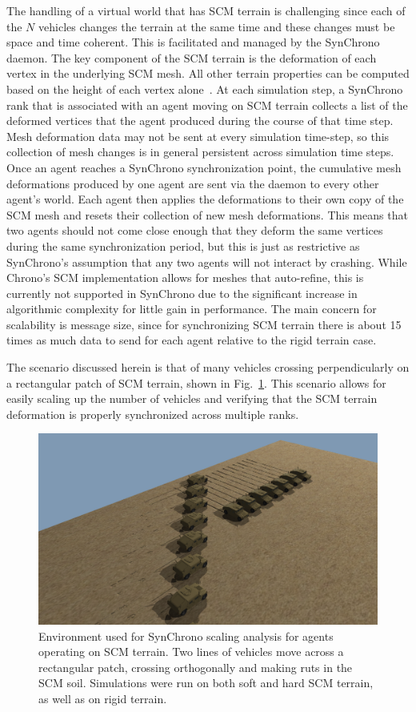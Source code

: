 \documentclass[12pt,twocolumn]{article}
\begin{document}
The handling of a virtual world that has SCM terrain is challenging since each of the $N$ vehicles changes the terrain at the same time and these changes must be space and time coherent. This is facilitated and managed by the SynChrono daemon. The key component of the SCM terrain is the deformation of each vertex in the underlying SCM mesh. All other terrain properties can be computed based on the height of each vertex alone~\cite{ChronoSCM2019}. At each simulation step, a SynChrono rank that is associated with an agent moving on SCM terrain collects a list of the deformed vertices that the agent produced during the course of that time step. Mesh deformation data may not be sent at every simulation time-step, so this collection of mesh changes is in general persistent across simulation time steps. Once an agent reaches a SynChrono synchronization point, the cumulative mesh deformations produced by one agent are sent via the daemon to every other agent's world. Each agent then applies the deformations to their own copy of the SCM mesh and resets their collection of new mesh deformations. This means that two agents should not come close enough that they deform the same vertices during the same synchronization period, but this is just as restrictive as SynChrono's assumption that any two agents will not interact by crashing. While Chrono's SCM implementation allows for meshes that auto-refine, this is currently not supported in SynChrono due to the significant increase in algorithmic complexity for little gain in performance. The main concern for scalability is message size, since for synchronizing SCM terrain there is about 15 times as much data to send for each agent relative to the rigid terrain case. 

The scenario discussed herein is that of many vehicles crossing perpendicularly on a rectangular patch of SCM terrain, shown in Fig.~\ref{fig:scalingenv}. This scenario allows for easily scaling up the number of vehicles and verifying that the SCM terrain deformation is properly synchronized across multiple ranks.

\begin{figure}
    \centering
    \includegraphics[width=\columnwidth]{Figs/Syn-SCM-setup.png}
    \caption{Environment used for SynChrono scaling analysis for agents operating on SCM terrain. Two lines of vehicles move across a rectangular patch, crossing orthogonally and making ruts in the SCM soil. Simulations were run on both soft and hard SCM terrain, as well as on rigid terrain.}
    \label{fig:scalingenv}
\end{figure}
\end{document}
